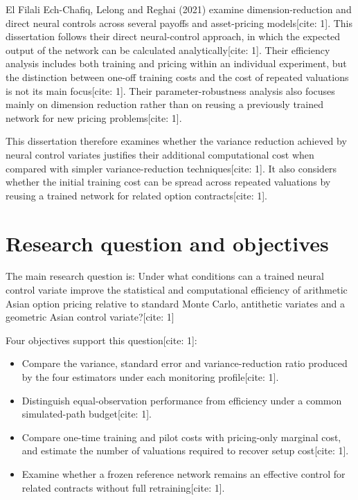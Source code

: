 El Filali Ech-Chafiq, Lelong and Reghai (2021) examine dimension-reduction and direct neural controls across several payoffs and asset-pricing models[cite: 1]. This dissertation follows their direct neural-control approach, in which the expected output of the network can be calculated analytically[cite: 1]. Their efficiency analysis includes both training and pricing within an individual experiment, but the distinction between one-off training costs and the cost of repeated valuations is not its main focus[cite: 1]. Their parameter-robustness analysis also focuses mainly on dimension reduction rather than on reusing a previously trained network for new pricing problems[cite: 1].

This dissertation therefore examines whether the variance reduction achieved by neural control variates justifies their additional computational cost when compared with simpler variance-reduction techniques[cite: 1]. It also considers whether the initial training cost can be spread across repeated valuations by reusing a trained network for related option contracts[cite: 1].

\section{Research question and objectives}
The main research question is:
Under what conditions can a trained neural control variate improve the statistical and computational efficiency of arithmetic Asian option pricing relative to standard Monte Carlo, antithetic variates and a geometric Asian control variate?[cite: 1]

Four objectives support this question[cite: 1]:
\begin{itemize}
    \item Compare the variance, standard error and variance-reduction ratio produced by the four estimators under each monitoring profile[cite: 1].
    \item Distinguish equal-observation performance from efficiency under a common simulated-path budget[cite: 1].
    \item Compare one-time training and pilot costs with pricing-only marginal cost, and estimate the number of valuations required to recover setup cost[cite: 1].
    \item Examine whether a frozen reference network remains an effective control for related contracts without full retraining[cite: 1].
\end{itemize}
